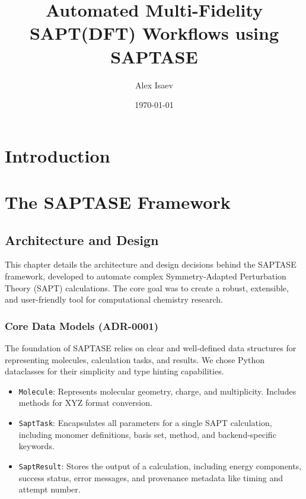 \documentclass[12pt, a4paper]{report}
\title{Automated Multi-Fidelity SAPT(DFT) Workflows using SAPTASE}
\author{Alex Isaev} %
\date{\today}
\begin{document}
\maketitle

\begin{abstract}
\lipsum[1] %
\end{abstract}

\tableofcontents
\newpage

\chapter{Introduction}
\lipsum[2-3] %

\chapter{The SAPTASE Framework}
\section{Architecture and Design}
This chapter details the architecture and design decisions behind the SAPTASE framework, developed to automate complex Symmetry-Adapted Perturbation Theory (SAPT) calculations. The core goal was to create a robust, extensible, and user-friendly tool for computational chemistry research.

\subsection{Core Data Models (ADR-0001)}
The foundation of SAPTASE relies on clear and well-defined data structures for representing molecules, calculation tasks, and results. We chose Python dataclasses for their simplicity and type hinting capabilities.
\begin{itemize}
    \item \texttt{Molecule}: Represents molecular geometry, charge, and multiplicity. Includes methods for XYZ format conversion.
    \item \texttt{SaptTask}: Encapsulates all parameters for a single SAPT calculation, including monomer definitions, basis set, method, and backend-specific keywords.
    \item \texttt{SaptResult}: Stores the output of a calculation, including energy components, success status, error messages, and provenance metadata like timing and attempt number.
\end{itemize}
\end{document}
